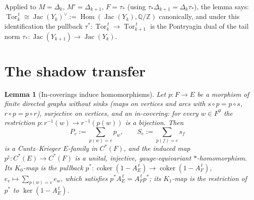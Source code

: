 \documentclass[11pt]{amsart}
\numberwithin{equation}{section}
\newtheorem{lemma}[theorem]{Lemma}
\theoremstyle{definition}
\theoremstyle{remark}
\newcommand{\Z}{\mathbb{Z}}
\newcommand{\Q}{\mathbb{Q}}
\newcommand{\Jac}{\operatorname{Jac}}
\newcommand{\coker}{\operatorname{coker}}
\newcommand{\Tor}{\operatorname{Tor}}
\newcommand{\Hom}{\operatorname{Hom}}
\newcommand{\ta}{\tau_*}
\newcommand{\taup}{\tau^*}
\begin{document}
Applied to $M=\Delta_k$, $M'=\Delta_{k+1}$, $F=\ta$ (using $\ta\Delta_{k+1}=\Delta_k\ta$),
the lemma says: $\Tor_k^{\,t}\cong\Jac(Y_k)^{\vee}:=\Hom(\Jac(Y_k),\Q/\Z)$ canonically,
and under this identification the pullback $\taup\colon\Tor_k^{\,t}\to\Tor_{k+1}^{\,t}$
is the Pontryagin dual of the tail norm $\ta\colon\Jac(Y_{k+1})\to\Jac(Y_k)$.

\section{The shadow transfer}\label{sec:transfer}

\begin{lemma}[In-coverings induce homomorphisms]\label{lem:incov}
Let $p\colon F\to E$ be a morphism of finite directed graphs without sinks (maps on
vertices and arcs with $s\circ p=p\circ s$, $r\circ p=p\circ r$), surjective on vertices,
and an \emph{in-covering}: for every $w\in F^0$ the restriction
$p\colon r^{-1}(w)\to r^{-1}(p(w))$ is a bijection. Then
\[
P_v:=\sum_{p(w)=v}p_w,\qquad S_e:=\sum_{p(f)=e}s_f
\]
is a Cuntz--Krieger $E$-family in $C^*(F)$, and the induced map
$p^{\natural}\colon C^*(E)\to C^*(F)$ is a unital, injective, gauge-equivariant
$*$-homomorphism. Its $K_0$-map is the pullback
$p^*\colon\coker(1-A_E^{\,t})\to\coker(1-A_F^{\,t})$, $e_v\mapsto\sum_{p(w)=v}e_w$, which
satisfies $p^*A_E^{\,t}=A_F^{\,t}p^*$; its $K_1$-map is the restriction of $p^*$ to
$\ker(1-A_E^{\,t})$.
\end{lemma}
\end{document}
